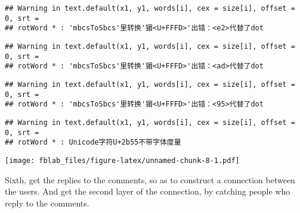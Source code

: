\documentclass[]{article}
\newenvironment{Shaded}{\begin{snugshade}}{\end{snugshade}}
\newcommand{\KeywordTok}[1]{\textcolor[rgb]{0.13,0.29,0.53}{\textbf{{#1}}}}
\newcommand{\DataTypeTok}[1]{\textcolor[rgb]{0.13,0.29,0.53}{{#1}}}
\newcommand{\DecValTok}[1]{\textcolor[rgb]{0.00,0.00,0.81}{{#1}}}
\newcommand{\StringTok}[1]{\textcolor[rgb]{0.31,0.60,0.02}{{#1}}}
\newcommand{\NormalTok}[1]{{#1}}
\begin{document}
\begin{verbatim}
## Warning in text.default(x1, y1, words[i], cex = size[i], offset = 0, srt =
## rotWord * : 'mbcsToSbcs'里转换'猸<U+FFFD>'出错：<e2>代替了dot
\end{verbatim}

\begin{verbatim}
## Warning in text.default(x1, y1, words[i], cex = size[i], offset = 0, srt =
## rotWord * : 'mbcsToSbcs'里转换'猸<U+FFFD>'出错：<ad>代替了dot
\end{verbatim}

\begin{verbatim}
## Warning in text.default(x1, y1, words[i], cex = size[i], offset = 0, srt =
## rotWord * : 'mbcsToSbcs'里转换'猸<U+FFFD>'出错：<95>代替了dot
\end{verbatim}

\begin{verbatim}
## Warning in text.default(x1, y1, words[i], cex = size[i], offset = 0, srt =
## rotWord * : Unicode字符U+2b55不带字体度量
\end{verbatim}

\texttt{[image: fblab\_files/figure-latex/unnamed-chunk-8-1.pdf]}

Sixth, get the replies to the comments, so as to construct a connection
between the users. And get the second layer of the connection, by
catching people who reply to the comments.

\begin{Shaded}
\end{Shaded}
\end{document}
